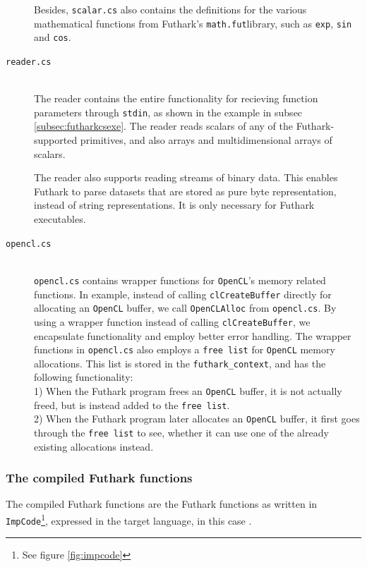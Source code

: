 \begin{description}
  Besides, \texttt{scalar.cs} also contains the \csharp{} definitions for the various
  mathematical functions from Futhark's \texttt{math.fut}library, such as \texttt{exp},
  \texttt{sin} and \texttt{cos}.


\item[\texttt{reader.cs}] \hfill\\
  The reader contains the entire functionality for recieving function parameters
  through \texttt{stdin}, as shown in the example in subsec
  \ref{subsec:futharkcsexe}.
  The reader reads scalars of any of the Futhark-supported primitives, and also arrays and multidimensional arrays of scalars.

  The reader also supports reading streams of binary data. This enables Futhark
  to parse datasets that are stored as pure byte representation, instead of
  string representations.
  It is only necessary for Futhark executables.
  

\item[\texttt{opencl.cs}] \hfill\\
  \texttt{opencl.cs} contains wrapper functions for \texttt{OpenCL}'s memory
  related functions. In example, instead of calling \texttt{clCreateBuffer} directly for
  allocating an \texttt{OpenCL} buffer, we call \texttt{OpenCLAlloc} from
  \texttt{opencl.cs}. By using a wrapper function instead of calling
  \texttt{clCreateBuffer}, we encapsulate functionality and employ better error
  handling.
  The wrapper functions in \texttt{opencl.cs} also employs a \texttt{free list} for \texttt{OpenCL}
  memory allocations. This list is stored in the \texttt{futhark\_context}, and
  has the following functionality:
  \\
  1) When the Futhark program frees an \texttt{OpenCL} buffer, it is not
  actually freed, but is instead added to the \texttt{free list}.\\
  2) When the Futhark program later allocates an \texttt{OpenCL} buffer, it
  first goes through the \texttt{free list} to see, whether it can use one of the already
  existing allocations instead.
\end{description}

\subsubsection{The compiled Futhark functions}
  The compiled Futhark functions are the Futhark functions as written in
  \texttt{ImpCode}\footnote{See figure \ref{fig:impcode}}, expressed in the
  target language, in this case \csharp{}.

